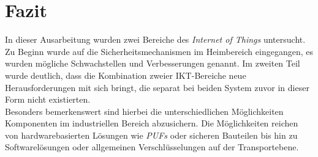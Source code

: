 \documentclass[conference]{IEEEtran}
\begin{document}
%





\section{Fazit}

In dieser Ausarbeitung wurden zwei Bereiche des \textit{Internet of Things} untersucht. Zu Beginn wurde auf die Sicherheitsmechanismen im Heimbereich eingegangen, es wurden mögliche Schwachstellen und Verbesserungen genannt. Im zweiten Teil wurde deutlich, dass die Kombination zweier IKT-Bereiche neue Herausforderungen mit sich bringt, die separat bei beiden System zuvor in dieser Form nicht existierten.\\
Besonders bemerkenswert sind hierbei die unterschiedlichen Möglichkeiten Komponenten im industriellen Bereich abzusichern. Die Möglichkeiten reichen von hardwarebasierten Lösungen wie \textit{PUFs} oder sicheren Bauteilen bis hin zu Softwarelösungen oder allgemeinen Verschlüsselungen auf der Transportebene. 
\end{document}
